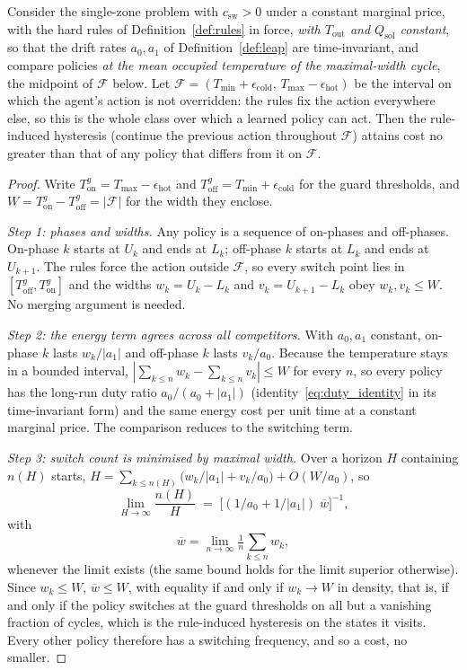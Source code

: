 \documentclass[3p,twocolumn,number]{elsarticle}
\newcommand{\Tmin}{T_{\min}}
\newcommand{\Tmax}{T_{\max}}
\newcommand{\Tout}{T_{\mathrm{out}}}
\newcommand{\csw}{c_{\mathrm{sw}}}
\begin{document}
\begin{corollary}
\label{cor:rules_sufficient}
Consider the single-zone problem with $\csw>0$ under a constant marginal price, with the hard rules of Definition~\ref{def:rules} in force, \emph{with $\Tout$ and $Q_{\mathrm{sol}}$ constant}, so that the drift rates $a_0,a_1$ of Definition~\ref{def:leap} are time-invariant, and compare policies \emph{at the mean occupied temperature of the maximal-width cycle}, the midpoint of $\mathcal{F}$ below. Let $\mathcal{F}=(\Tmin+\epsilon_{\mathrm{cold}},\,\Tmax-\epsilon_{\mathrm{hot}})$ be the interval on which the agent's action is not overridden: the rules fix the action everywhere else, so this is the whole class over which a learned policy can act. Then the rule-induced hysteresis (continue the previous action throughout $\mathcal{F}$) attains cost no greater than that of any policy that differs from it on $\mathcal{F}$.
\end{corollary}
\begin{proof}
Write $T_{\mathrm{on}}^{g}=\Tmax-\epsilon_{\mathrm{hot}}$ and $T_{\mathrm{off}}^{g}=\Tmin+\epsilon_{\mathrm{cold}}$ for the guard thresholds, and $W=T_{\mathrm{on}}^{g}-T_{\mathrm{off}}^{g}=|\mathcal{F}|$ for the width they enclose.

\emph{Step 1: phases and widths.} Any policy is a sequence of on-phases and off-phases. On-phase $k$ starts at $U_k$ and ends at $L_k$; off-phase $k$ starts at $L_k$ and ends at $U_{k+1}$. The rules force the action outside $\mathcal{F}$, so every switch point lies in $[T_{\mathrm{off}}^{g},T_{\mathrm{on}}^{g}]$ and the widths $w_k=U_k-L_k$ and $v_k=U_{k+1}-L_k$ obey $w_k,v_k\le W$. No merging argument is needed.

\emph{Step 2: the energy term agrees across all competitors.} With $a_0,a_1$ constant, on-phase $k$ lasts $w_k/|a_1|$ and off-phase $k$ lasts $v_k/a_0$. Because the temperature stays in a bounded interval, $|\sum_{k\le n}w_k-\sum_{k\le n}v_k|\le W$ for every $n$, so every policy has the long-run duty ratio $a_0/(a_0+|a_1|)$ (identity~\eqref{eq:duty_identity} in its time-invariant form) and the same energy cost per unit time at a constant marginal price. The comparison reduces to the switching term.

\emph{Step 3: switch count is minimised by maximal width.} Over a horizon $H$ containing $n(H)$ starts, $H=\sum_{k\le n(H)}\bigl(w_k/|a_1|+v_k/a_0\bigr)+O(W/a_0)$, so
\[
\lim_{H\to\infty}\frac{n(H)}{H}
   \;=\;\Big[(1/a_0+1/|a_1|)\;\overline{w}\Big]^{-1},
\] with
\[
\overline{w}=\lim_{n\to\infty}\tfrac1n\sum_{k\le n}w_k ,
\] whenever the limit exists (the same bound holds for the limit superior otherwise). Since $w_k\le W$, $\overline{w}\le W$, with equality if and only if $w_k\to W$ in density, that is, if and only if the policy switches at the guard thresholds on all but a vanishing fraction of cycles, which is the rule-induced hysteresis on the states it visits. Every other policy therefore has a switching frequency, and so a cost, no smaller.
\end{proof}
\end{document}
